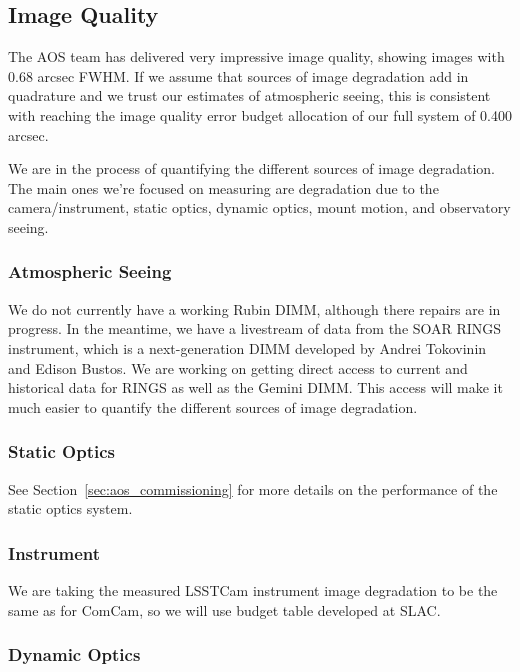 \subsection{Image Quality}
\label{sec:image_quality}

The AOS team has delivered very impressive image quality, showing images with 0.68 arcsec FWHM. If we assume that sources of image degradation add in quadrature and we trust our estimates of atmospheric seeing, this is consistent with reaching the image quality error budget allocation of our full system of 0.400 arcsec.

We are in the process of quantifying the different sources of image degradation. The main ones we're focused on measuring are degradation due to the camera/instrument, static optics, dynamic optics, mount motion, and observatory seeing.

\subsubsection{Atmospheric Seeing}

We do not currently have a working Rubin DIMM, although there repairs are in progress. In the meantime, we have a livestream of data from the SOAR RINGS instrument, which is a  next-generation DIMM developed by Andrei Tokovinin and Edison Bustos. We are working on getting direct access to current and historical data for RINGS as well as the Gemini DIMM. This access will make it much easier to quantify the different sources of image degradation.

\subsubsection{Static Optics}

See Section~\ref{sec:aos_commissioning} for more details on the performance of the static optics system.

\subsubsection{Instrument}

We are taking the measured LSSTCam instrument image degradation to be the same as for ComCam, so we will use budget table developed at SLAC.

\subsubsection{Dynamic Optics}

